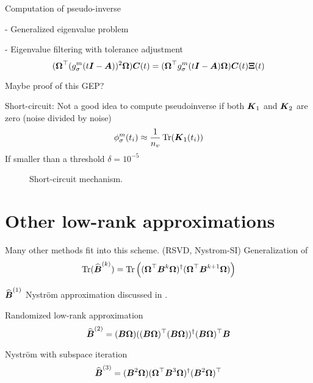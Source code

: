 Computation of pseudo-inverse

- Generalized eigenvalue problem

- Eigenvalue filtering with tolerance adjustment
\begin{equation}
    (\boldsymbol{\Omega}^{\top} (g_{\sigma}^m(t\boldsymbol{I} - \boldsymbol{A}))^2 \boldsymbol{\Omega}) \boldsymbol{C}(t) = (\boldsymbol{\Omega}^{\top} g_{\sigma}^m(t\boldsymbol{I} - \boldsymbol{A}) \boldsymbol{\Omega}) \boldsymbol{C}(t) \boldsymbol{\Xi}(t)
    \label{equ:3-nystrom-generalized-eigenproblem}
\end{equation}

Maybe proof of this GEP?

Short-circuit: Not a good idea to compute pseudoinverse if
both $\boldsymbol{K}_1$ and $\boldsymbol{K}_2$ are zero (noise divided by noise)
\begin{equation}
    \phi_{\sigma}^m(t_i) \approx \frac{1}{n_v} \operatorname{Tr}(\boldsymbol{K}_1(t_i))
    \label{equ:3-nystrom-shortcircuit-hutchinson}
\end{equation}
If smaller than a threshold $\delta = 10^{-5}$

\begin{figure}[ht]
    \centering
    
    \caption{Short-circuit mechanism.}
    \label{fig:3-nystrom-short-circuit-mechanism}
\end{figure}


\section{Other low-rank approximations}
\label{sec:3-nystrom-other-low-rank}

Many other methods fit into this scheme. (RSVD, Nystrom-SI)
Generalization of 
\begin{equation}
    \operatorname{Tr}(\widehat{\boldsymbol{B}}^{(k)})
        = \operatorname{Tr}\left((\boldsymbol{\Omega}^{\top} \boldsymbol{B}^k \boldsymbol{\Omega})^{\dagger} (\boldsymbol{\Omega}^{\top} \boldsymbol{B}^{k+1} \boldsymbol{\Omega}) \right)
    \label{equ:3-nystrom-trace-generalization}
\end{equation}

$\widehat{\boldsymbol{B}}^{(1)}$ Nystr\"om approximation discussed in .

Randomized low-rank approximation \cite{halko2011finding, tropp2023randomized}
\begin{equation}
    \widehat{\boldsymbol{B}}^{(2)} = (\boldsymbol{B} \boldsymbol{\Omega}) ((\boldsymbol{B} \boldsymbol{\Omega})^{\top} (\boldsymbol{B} \boldsymbol{\Omega}))^{\dagger} (\boldsymbol{B} \boldsymbol{\Omega})^{\top} \boldsymbol{B}
    \label{equ:3-nystrom-RSVD}
\end{equation}

Nystr\"om with subspace iteration \cite{tropp2023randomized}
\begin{equation}
    \widehat{\boldsymbol{B}}^{(3)} = (\boldsymbol{B}^2 \boldsymbol{\Omega}) (\boldsymbol{\Omega}^{\top} \boldsymbol{B}^3 \boldsymbol{\Omega})^{\dagger} (\boldsymbol{B}^2 \boldsymbol{\Omega})^{\top}
    \label{equ:3-nystrom-nystrom-SI}
\end{equation}
